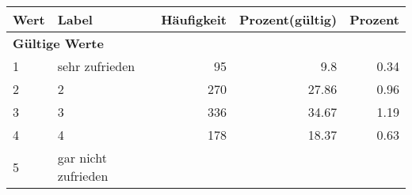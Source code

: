      \begin{longtable}{lXrrr}
     \toprule
     \textbf{Wert} & \textbf{Label} & \textbf{Häufigkeit} & \textbf{Prozent(gültig)} & \textbf{Prozent} \\
     \endhead
     \midrule
     \multicolumn{5}{l}{\textbf{Gültige Werte}}\\

     1 &
     \multicolumn{1}{X}{ sehr zufrieden   } &


       \num{95} &
       \num[round-mode=places,round-precision=2]{9,8} &
         \num[round-mode=places,round-precision=2]{0,34} \\

     2 &
     \multicolumn{1}{X}{ 2   } &


       \num{270} &
       \num[round-mode=places,round-precision=2]{27,86} &
         \num[round-mode=places,round-precision=2]{0,96} \\

     3 &
     \multicolumn{1}{X}{ 3   } &


       \num{336} &
       \num[round-mode=places,round-precision=2]{34,67} &
         \num[round-mode=places,round-precision=2]{1,19} \\

     4 &
     \multicolumn{1}{X}{ 4   } &


       \num{178} &
       \num[round-mode=places,round-precision=2]{18,37} &
         \num[round-mode=places,round-precision=2]{0,63} \\

     5 &
     \multicolumn{1}{X}{ gar nicht zufrieden   } &



\end{longtable}
